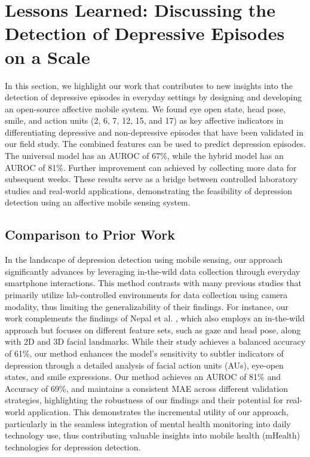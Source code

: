 \section{Lessons Learned: Discussing the Detection of Depressive Episodes on a Scale}
In this section, we highlight our work that contributes to new insights into the detection of depressive episodes in everyday settings by designing and developing an open-source affective mobile system. We found eye open state, head pose, smile, and action units (2, 6, 7, 12, 15, and 17) as key affective indicators in differentiating depressive and non-depressive episodes that have been validated in our field study. The combined features can be used to predict depression episodes. The universal model has an AUROC of 67\%, while the hybrid model has an AUROC of 81\%. Further improvement can achieved by collecting more data for subsequent weeks. These results serve as a bridge between controlled laboratory studies and real-world applications, demonstrating the feasibility of depression detection using an affective mobile sensing system.

\subsection{Comparison to Prior Work}
In the landscape of depression detection using mobile sensing, our approach significantly advances by leveraging in-the-wild data collection through everyday smartphone interactions. This method contrasts with many previous studies that primarily utilize lab-controlled \cite{cohn2009detecting, valstar2013avec, song2020spectral, kong2022automatic, casado2023depression} environments for data collection using camera modality, thus limiting the generalizability of their findings. For instance, our work complements the findings of Nepal et al. \cite{nepal2024moodcapture}, which also employs an in-the-wild approach but focuses on different feature sets, such as gaze and head pose, along with 2D and 3D facial landmarks. While their study achieves a balanced accuracy of 61\%, our method enhances the model's sensitivity to subtler indicators of depression through a detailed analysis of facial action units (AUs), eye-open states, and smile expressions. Our method achieves an AUROC of 81\% and Accuracy of 69\%, and maintains a consistent MAE across different validation strategies, highlighting the robustness of our findings and their potential for real-world application. This demonstrates the incremental utility of our approach, particularly in the seamless integration of mental health monitoring into daily technology use, thus contributing valuable insights into mobile health (mHealth) technologies for depression detection.

